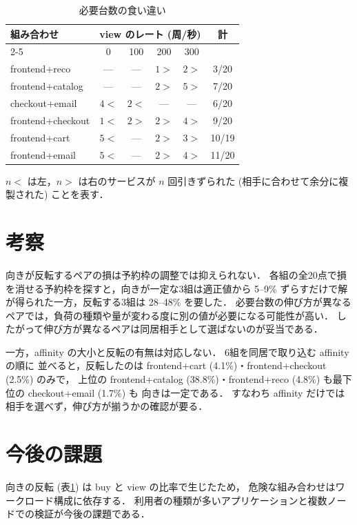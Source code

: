 \documentclass[T,J]{fose}
\begin{document}
\begin{table}[tb]
	\centering
	\caption{必要台数の食い違い}
	\label{table:pairs}
	\footnotesize
	\doublerulesep=0.3pt
	\setlength{\tabcolsep}{3pt}
	\begin{tabular}{lccccc}
		\hline\hline\hline
		組み合わせ & \multicolumn{4}{c}{view のレート (周/秒)} & 計 \\ \cline{2-5}
		                  & 0 & 100 & 200 & 300 & \\ \hline
		frontend+reco     & --- & --- & $1{>}$ & $2{>}$ & 3/20 \\
		frontend+catalog  & --- & --- & $2{>}$ & $5{>}$ & 7/20 \\
		checkout+email    & $4{<}$ & $2{<}$ & --- & --- & 6/20 \\ \hline
		frontend+checkout & $1{<}$ & $2{>}$ & $2{>}$ & $4{>}$ & 9/20 \\
		frontend+cart     & $5{<}$ & --- & $2{>}$ & $3{>}$ & 10/19 \\
		frontend+email    & $5{<}$ & --- & $2{>}$ & $4{>}$ & 11/20 \\ \hline
	\end{tabular}

	{\footnotesize $n{<}$ は左，$n{>}$ は右のサービスが $n$ 回引きずられた
	(相手に合わせて余分に複製された) ことを表す．}
\end{table}

\section{考察}

向きが反転するペアの損は予約枠の調整では抑えられない．
各組の全20点で損を消せる予約枠を探すと，向きが一定な3組は適正値から
5--9\% ずらすだけで解が得られた一方，反転する3組は 28--48\% を要した．
必要台数の伸び方が異なるペアでは，負荷の種類や量が変わる度に別の値が必要になる可能性が高い．
したがって伸び方が異なるペアは同居相手として選ばないのが妥当である．

一方，affinity の大小と反転の有無は対応しない．
6組を同居で取り込む affinityの順に
並べると，反転したのは frontend+cart (4.1\%)・frontend+checkout (2.5\%) のみで，
上位の frontend+catalog (38.8\%)・frontend+reco (4.8\%) も最下位の checkout+email (1.7\%) も
向きは一定である．
すなわち affinity だけでは相手を選べず，伸び方が揃うかの確認が要る．


\section{今後の課題}

向きの反転 (表\ref{table:pairs}) は buy と view の比率で生じたため，
危険な組み合わせはワークロード構成に依存する．
利用者の種類が多いアプリケーションと複数ノードでの検証が今後の課題である．



\end{document}
